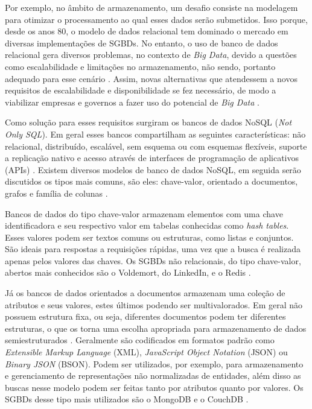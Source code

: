 Por exemplo, no âmbito de armazenamento, um desafio consiste na modelagem para otimizar o 
processamento ao qual esses dados serão submetidos. Isso porque, desde os anos 80, o modelo 
de dados relacional tem dominado o mercado em diversas implementações de SGBDs. No entanto, 
o uso de banco de dados relacional gera diversos problemas, no contexto de \textit{Big Data}, 
devido a questões como escalabilidade e limitações no armazenamento, não sendo, portanto 
adequado para esse cenário \cite{moniruzzaman2013nosql}. Assim, novas alternativas que 
atendessem a novos requisitos de escalabilidade e disponibilidade se fez necessário, de modo 
a viabilizar empresas e governos a fazer uso do potencial de \textit{Big Data} 
\cite{de2010nosql}.

Como solução para esses requisitos surgiram os bancos de dados NoSQL (\textit{Not Only SQL}). 
Em geral esses bancos compartilham as seguintes características: não relacional, distribuído, 
escalável, sem esquema ou com esquemas flexíveis, suporte a replicação nativo e acesso 
através de interfaces de programação de aplicativos (APIs) \cite{de2010nosql}. 
Existem diversos modelos de banco de dados NoSQL, em seguida serão discutidos os tipos mais 
comuns, são eles: chave-valor, orientado a documentos, grafos e família de colunas 
\cite{de2010nosql}.

Bancos de dados do tipo chave-valor armazenam elementos com uma chave identificadora e seu 
respectivo valor em tabelas conhecidas como \textit{hash tables}. Esses valores podem ser 
textos comuns ou estruturas, como listas e conjuntos. São ideais para respostas a requisições 
rápidas, uma vez que a busca é realizada apenas pelos valores das chaves. Os SGBDs não 
relacionais, do tipo chave-valor, abertos mais conhecidos são o Voldemort, do LinkedIn, e o 
Redis \cite{moniruzzaman2013nosql}.

Já os bancos de dados orientados a documentos armazenam uma coleção de atributos e seus 
valores, estes últimos podendo ser multivalorados. Em geral não possuem estrutura fixa, 
ou seja, diferentes documentos podem ter diferentes estruturas, o que os torna uma escolha 
apropriada para armazenamento de dados semiestruturados \cite{de2010nosql}. 
Geralmente são codificados em formatos padrão como \textit{Extensible Markup Language} (XML), 
\textit{JavaScript Object Notation} (JSON) ou \textit{Binary JSON} (BSON).  Podem ser 
utilizados, por exemplo, para armazenamento e gerenciamento de representações não normalizadas 
de entidades, além disso as buscas nesse modelo podem ser feitas tanto por atributos quanto 
por valores. Os SGBDs desse tipo mais utilizados são o MongoDB e o CouchDB 
\cite{moniruzzaman2013nosql}.

